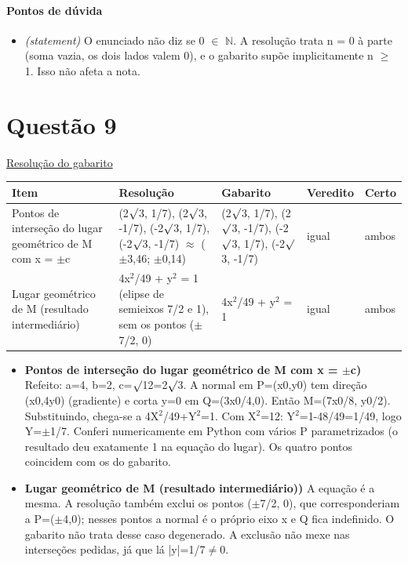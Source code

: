 \documentclass{article}%
\begin{document}
\paragraph{Pontos de dúvida}%
\begin{itemize}%
\item%
\textit{(statement)} O enunciado não diz se 0 $\in$ $\mathbb{N}$. A resolução trata n = 0 à parte (soma vazia, os dois lados valem 0), e o gabarito supõe implicitamente n $\geq$ 1. Isso não afeta a nota.%
\end{itemize}%
\section*{Questão 9}%
\href{https://poliedroresolve.sistemapoliedro.com.br/vestibulares/ime/2027/ime-2-fase-dia-1-26-10-2026-2-fase-dia-1/dissertativa-9-matematica-2-fase-dia-1-ime-2027}{Resolução do gabarito}\par\smallskip%
\begin{longtable}{@{}p{} p{} p{} p{} p{}@{}}\toprule Item & Resolução & Gabarito & Veredito & Certo \\ \midrule
Pontos de interseção do lugar geométrico de M com x = $\pm$c & (2$\surd$3, 1/7), (2$\surd$3, -1/7), (-2$\surd$3, 1/7), (-2$\surd$3, -1/7) $\approx$ ($\pm$3,46; $\pm$0,14) & (2$\surd$3, 1/7), (2$\surd$3, -1/7), (-2$\surd$3, 1/7), (-2$\surd$3, -1/7) & igual & ambos \\
Lugar geométrico de M (resultado intermediário) & 4x$^2$/49 + y$^2$ = 1 (elipse de semieixos 7/2 e 1), sem os pontos ($\pm$7/2, 0) & 4x$^2$/49 + y$^2$ = 1 & igual & ambos \\
\bottomrule\end{longtable}%
\begin{itemize}%
\item%
\textbf{Pontos de interseção do lugar geométrico de M com x = $\pm$c)} Refeito: a=4, b=2, c=$\surd$12=2$\surd$3. A normal em P=(x0,y0) tem direção (x0,4y0) (gradiente) e corta y=0 em Q=(3x0/4,0). Então M=(7x0/8, y0/2). Substituindo, chega{-}se a 4X$^2$/49+Y$^2$=1. Com X$^2$=12: Y$^2$=1-48/49=1/49, logo Y=$\pm$1/7. Conferi numericamente em Python com vários P parametrizados (o resultado deu exatamente 1 na equação do lugar). Os quatro pontos coincidem com os do gabarito.%
\item%
\textbf{Lugar geométrico de M (resultado intermediário))} A equação é a mesma. A resolução também exclui os pontos ($\pm$7/2, 0), que corresponderiam a P=($\pm$4,0); nesses pontos a normal é o próprio eixo x e Q fica indefinido. O gabarito não trata desse caso degenerado. A exclusão não mexe nas interseções pedidas, já que lá |y|=1/7$\neq$0.%
\end{itemize}%
\end{document}
